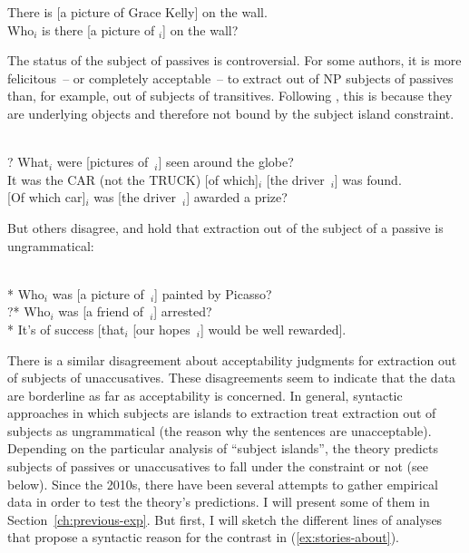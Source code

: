 \eal \label{ex:passives-are-good}
\ex There is [a picture of Grace Kelly] on the wall. \label{ex:existential-cx}
\ex \citep[102]{Stepanov.2007}\\
Who$_i$ is there [a picture of \trace{}$_i$] on the wall?
\label{ex:existential-cx-subextraction}
\zl 

The status of the subject of passives is controversial. For some authors, it is more felicitous~-- or completely acceptable~-- to extract out of NP subjects of passives than, for example, out of subjects of transitives. Following \citet{Chomsky.2008}, this is because they are underlying objects and therefore not bound by the subject island constraint.

\eal \label{ex:passives-are-bad}
\ex \citep[268]{Kluender.1998}\\
? What$_i$ were [pictures of~\trace{}$_i$] seen around the globe?
\ex \citep[147]{Chomsky.2008}\\
{} It was the CAR (not the TRUCK) [of which]$_i$ [the driver~\trace{}$_i$] was found.  \label{ex:passiv-chomsky-cleft}
\ex \citep[147]{Chomsky.2008}\\
{} [Of which car]$_i$ was [the driver~\trace{}$_i$] awarded a prize?
\label{ex:passiv-chomsky}
\zl 

But others disagree, and hold that extraction out of the subject of a passive is ungrammatical:

\eal
\ex \citep[157]{Erteschik-Shir.1973}\\
 * Who$_i$ was [a picture of~\trace{}$_i$] painted by Picasso?
\ex \citep[85]{Stepanov.2007}\\
?* Who$_i$ was [a friend of~\trace{}$_i$] arrested?
\ex \citep[325]{Wexler.1980}\\
* It's of success [that$_i$ [our hopes~\trace{}$_i$] would be well rewarded].
\zl 

There is a similar disagreement about acceptability judgments for extraction out of subjects of unaccusatives. These disagreements seem to indicate that the data are borderline as far as acceptability is concerned. In general, syntactic approaches in which subjects are islands to extraction treat extraction out of subjects as ungrammatical (the reason why the sentences are unacceptable). Depending on the particular analysis of ``subject islands'', the theory predicts subjects of passives or unaccusatives to fall under the constraint or not (see below). Since the 2010s, there have been several attempts to gather empirical data in order to test the theory's predictions. I will present some of them in Section~\ref{ch:previous-exp}. But first, I will sketch the different lines of analyses that propose a syntactic reason for the contrast in (\ref{ex:stories-about}). 

